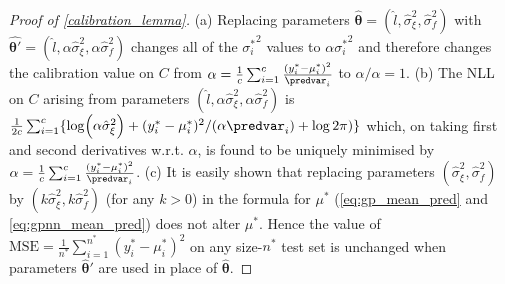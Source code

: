 \begin{proof}[Proof of \autoref{calibration_lemma}]
  (a) Replacing parameters $\hat{\bm{\theta}} = (\hat{l},\hat{\sigma}_\xi^2,\hat{\sigma}_f^2)$ with $\hat{\bm{\theta}'} = (\hat{l},\alpha \hat{\sigma}_\xi^2,\alpha \hat{\sigma}_f^2)$ changes all of the ${\sigma_i^*}^2$ values to $\alpha {\sigma_i^*}^2$ and therefore changes the calibration value on $C$ from $\alpha = \frac{1}{c}\sum_{i=1}^c \frac{(y_i^* - \mu_i^*)^2}{\predvar_i}$  to $\alpha/\alpha = 1$. (b) The NLL on $C$ arising from parameters $(\hat{l},\alpha \hat{\sigma}_\xi^2,\alpha \hat{\sigma}_f^2)$ is $\frac{1}{2c} \sum_{i=1}^c \{ \log(\alpha \hat{\sigma}_\xi^2) + (y_i^*-\mu_i^*)^2/(\alpha \predvar_i) + \log2\pi)\}$ which, on taking first and second derivatives w.r.t. $\alpha$, is found to be uniquely minimised by $\alpha = \frac{1}{c}\sum_{i=1}^c \frac{(y_i^* - \mu_i^*)^2}{\predvar_i}$. (c) It is easily shown that replacing parameters $(\hat{\sigma}_\xi^2,\hat{\sigma}_f^2)$ by $(k\hat{\sigma}_\xi^2,k \hat{\sigma}_f^2)$ (for any $k > 0$) in the formula for $\mu^*$ (\autoref{eq:gp_mean_pred} and \autoref{eq:gpnn_mean_pred}) does not alter $\mu^*$. Hence the value of $\mbox{MSE} = \frac{1}{n^*} \sum_{i=1}^{n^*} (y^*_i - {\mu_i^*})^2$ on any size-$n^*$ test set is unchanged when parameters $\hat{\bm{\theta}}'$  are used in place of $\hat{\bm{\theta}}$.
\end{proof}
